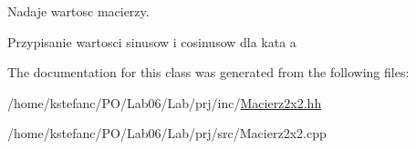 Nadaje wartosc macierzy. 

Przypisanie wartosci sinusow i cosinusow dla kata a 

The documentation for this class was generated from the following files\+:\begin{DoxyCompactItemize}
\item 
/home/kstefanc/\+P\+O/\+Lab06/\+Lab/prj/inc/\hyperlink{_macierz2x2_8hh}{Macierz2x2.\+hh}\item 
/home/kstefanc/\+P\+O/\+Lab06/\+Lab/prj/src/Macierz2x2.\+cpp\end{DoxyCompactItemize}
